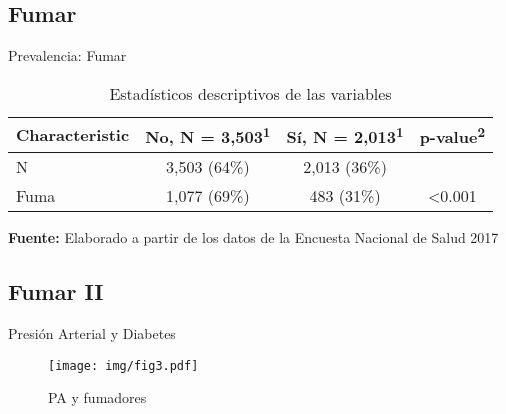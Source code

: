 \documentclass[aspectratio=169]{beamer}
\begin{document}
\subsection*{Fumar}
\begin{frame}{Prevalencia: Fumar}
    \begin{table}[]
\caption{\small Estadísticos descriptivos de las variables}
    \centering
    \small

    \captionsetup[table]{labelformat=empty,skip=1pt}
\begin{tabular}{lccc}
\toprule
\textbf{Characteristic} & \textbf{No}, N = 3,503\textsuperscript{1} & \textbf{Sí}, N = 2,013\textsuperscript{1} & \textbf{p-value}\textsuperscript{2} \\ 
\midrule
N & 3,503 (64\%) & 2,013 (36\%) &  \\ 
Fuma & 1,077 (69\%) & 483 (31\%) & <0.001 \\ 
 \bottomrule
\end{tabular}
    \vspace{5mm}
    
    {\raggedright \small \textbf{Fuente:} Elaborado a partir de los datos de la Encuesta Nacional de Salud 2017 \par}
\end{table}
\end{frame}

\subsection*{Fumar II}
\begin{frame}{Presión Arterial y Diabetes}
    \begin{figure}
        \centering
        \texttt{[image: img/fig3.pdf]}
        \caption{PA y fumadores}
        \label{fig:my_label}
    \end{figure}
\end{frame}
\end{document}
